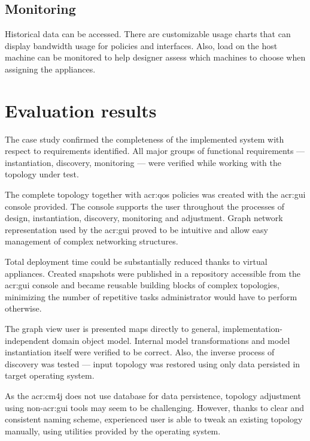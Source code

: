 \documentclass[11pt,openany]{book}
\begin{document}
      \subsection{Monitoring}
      \label{sub:uc:enhance:monitoring}

        Historical data can be accessed. There are customizable usage charts that can display bandwidth usage for
        policies and interfaces. Also, load on the host machine can be monitored to help designer assess which machines
        to choose when assigning the appliances.


    \section{Evaluation results}
    \label{sec:uc:eval}

      The case study confirmed the completeness of the implemented system with respect to requirements identified. All
      major groups of functional requirements --- instantiation, discovery, monitoring --- were verified while working
      with the topology under test.

      The complete topology together with \gls{acr:qos} policies was created with the \gls{acr:gui} console provided.
      The console supports the user throughout the processes of design, instantiation, discovery, monitoring and
      adjustment. Graph network representation used by the \gls{acr:gui} proved to be intuitive and allow easy
      management of complex networking structures.

      Total deployment time could be substantially reduced thanks to virtual appliances. Created snapshots were
      published in a repository accessible from the \gls{acr:gui} console and became reusable building blocks of complex
      topologies, minimizing the number of repetitive tasks administrator would have to perform otherwise.

      The graph view user is presented maps directly to general, implementation-independent domain object model.
      Internal model transformations and model instantiation itself were verified to be correct. Also, the inverse
      process of discovery was tested --- input topology was restored using only data persisted in target operating
      system.

      As the \gls{acr:cm4j} does not use database for data persistence, topology adjustment using non-\gls{acr:gui}
      tools may seem to be challenging. However, thanks to clear and consistent naming scheme, experienced user is able
      to tweak an existing topology manually, using utilities provided by the operating system.
\end{document}

